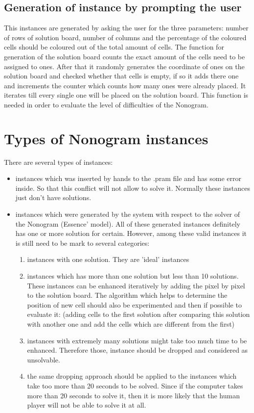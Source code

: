 \subsection{Generation of instance by prompting the user}
\label{subsec:prompted_generation}
This instances are generated by asking the user for the three parameters: number of rows of solution board, number of columns and the percentage of the coloured cells should be coloured out of the total amount of cells. The function for generation of the solution board counts the exact amount of the cells need to be assigned to ones. After that it randomly generates the coordinate of ones on the solution board and checked whether that cells is empty, if so it adds there one and increments the counter which counts how many ones were already placed. It iterates till every single one will be placed on the solution board. This function is needed in order to evaluate the level of difficulties of the Nonogram.


\section{Types of Nonogram instances}
\label{sec:types_isntances}
There are several types of instances:
\begin{itemize}
	\item instances which was inserted by hands to the .pram file and has some error inside. So that this conflict will not allow to solve it. Normally these instances just don't have solutions.
	\item instances which were generated by the system with respect to the solver of the Nonogram (Essence' model). All of these generated instances definitely has one or more solution for certain. However, among these valid instances it is still need to be mark to several categories:

	\begin{enumerate}
	\item instances with one solution. They are 'ideal' instances
	\item instances which has more than one solution but less than 10 solutions. These instances can be enhanced iteratively by adding the pixel by pixel to the solution board. The algorithm which helps to determine the position of new cell should also be experimented and then if possible to evaluate it: (adding cells to the first solution after comparing this solution with another one and add the cells which are different from the first)
	\item instances with extremely many solutions might take too much time to be enhanced. Therefore those, instance should be dropped and considered as unsolvable.
	\item the same dropping approach should be applied to the instances which take too more than 20 seconds to be solved. Since if the computer takes more than 20 seconds to solve it, then it is more likely that the human player will not be able to solve it at all. 
	\end{enumerate}

\end{itemize}

